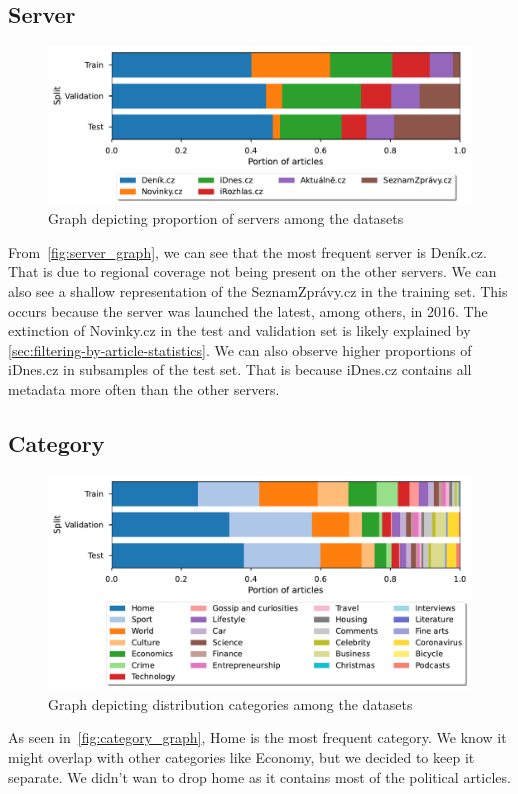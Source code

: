 \subsection{Server}
\label{sec:server-desc}
\begin{figure}[H]
    \centering
    \includegraphics[width=1.0\textwidth]{img/tasks_graph/server.pdf}
    \caption{Graph depicting proportion of servers among the datasets}
    \label{fig:server_graph}
\end{figure}
From~\autoref{fig:server_graph}, we can see that the most frequent server is Deník.cz.
That is due to regional coverage not being present on the other servers. We can also see
a shallow representation of the SeznamZprávy.cz in the training set.
This occurs because the server was launched the latest, among others, in 2016.
The extinction of Novinky.cz in the test and validation set is likely explained by \autoref{sec:filtering-by-article-statistics}.
We can also observe higher proportions of iDnes.cz in subsamples of the test set.
That is because iDnes.cz contains all metadata more often than the other servers.


\subsection{Category}
\begin{figure}[h]
    \centering
    \includegraphics[width=1.0\textwidth]{img/tasks_graph/category.pdf}
    \caption{Graph depicting distribution categories among the datasets}
    \label{fig:category_graph}
\end{figure}
As seen in~\autoref{fig:category_graph}, Home is the most frequent category.
We know it might overlap with other categories like Economy, but we decided to keep it separate.
We didn't wan to drop home as it contains most of the political articles.

